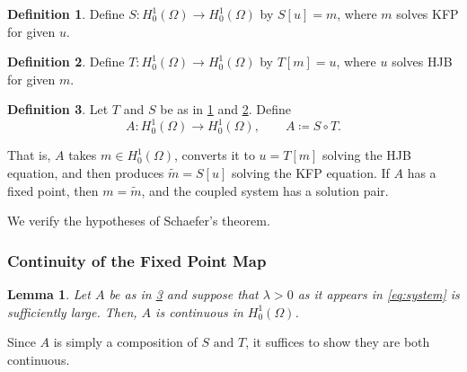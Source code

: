 \documentclass[11pt]{article}
\numberwithin{equation}{section}
\newtheorem{lemma}[lemma]{Lemma}
\theoremstyle{definition}
\newtheorem{definition}[definition]{Definition}
\theoremstyle{remark}
\newcommand{\Honez}{H_0^1(\Omega)}
\begin{document}
\begin{definition}
\label{def:S-map}
Define $S:\Honez\to\Honez$ by $S[u]=m$, where $m$ solves KFP for given $u$.
\end{definition}
\begin{definition}
\label{def:T-map}
Define $T:\Honez\to\Honez$ by $T[m]=u$, where $u$ solves HJB for given $m$.
\end{definition}
\begin{definition}
\label{def:A-map}
Let $T$ and $S$ be as in \cref{def:S-map} and \cref{def:T-map}. Define
\[A:\Honez\to\Honez,\qquad A \coloneqq S\circ T.\]
\end{definition}

That is, $A$ takes $m\in\Honez$, converts it to $u=T[m]$ solving the HJB equation, and then produces $\widetilde m=S[u]$ solving the KFP equation.
If $A$ has a fixed point, then $m=\widetilde m$, and the coupled system has a solution pair.

We verify the hypotheses of Schaefer's theorem.
\subsubsection{Continuity of the Fixed Point Map}
\begin{lemma}
  \label{thm:A-cont}
  Let $A$ be as in \cref{def:A-map} and suppose that $\lambda > 0$ as it appears in \cref{eq:system} is sufficiently large.
  Then, $A$ is continuous in $\Honez$. 
\end{lemma}
Since $A$ is simply a composition of $S \text{ and } T$, it suffices to show they are both continuous.
\end{document}
